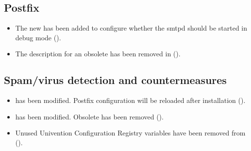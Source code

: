\subsection{Postfix}
\begin{itemize}

\item The new  has been added to configure
whether the smtpd should be started in debug mode ().

\item The description for an obsolete \ucsUCRV{} has been removed in
 ().

\end{itemize}

\subsection{Spam/virus detection and countermeasures}
\begin{itemize}

\item {} has been modified. Postfix
configuration will be reloaded after installation ().

\item {} has been modified. Obsolete
 has been removed ().

\item Unused Univention Configuration Registry variables have been removed
from  ().

\end{itemize}


